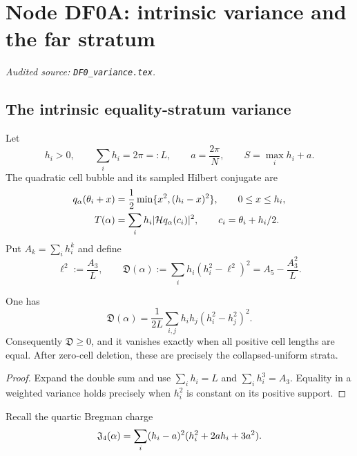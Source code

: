 \begingroup
\section{Node DF0A: intrinsic variance and the far stratum}
\label{module:DF0A}
\noindent\textit{Audited source: \nolinkurl{DF0_variance.tex}.}
\subsection{The intrinsic equality-stratum variance}

Let
\begin{equation}\label{DF0A:eq:data}
 h_i>0,\qquad \sum_i h_i=2\pi=:L,
 \qquad a=\frac{2\pi}{N},\qquad
 S=\max_i h_i+a.
\end{equation}
The quadratic cell bubble and its sampled Hilbert conjugate are
\begin{align}
 q_\alpha(\theta_i+x)
 &=\frac12\min\{x^2,(h_i-x)^2\},\qquad 0\le x\le h_i,
 \label{DF0A:eq:q}\\
 T(\alpha)&=\sum_i h_i|\mathcal H q_\alpha(c_i)|^2,
 \qquad c_i=\theta_i+h_i/2.\label{DF0A:eq:T}
\end{align}
Put $A_k=\sum_i h_i^k$ and define
\begin{equation}\label{DF0A:eq:D}
 \ell^2:=\frac{A_3}{L},
 \qquad
 \boxed{\mathfrak D(\alpha)
 :=\sum_i h_i(h_i^2-\ell^2)^2
 =A_5-\frac{A_3^2}{L}.}
\end{equation}

\begin{lemma}
\label{DF0A:lem:pair}
One has
\begin{equation}\label{DF0A:eq:pair}
 \mathfrak D(\alpha)
 =\frac1{2L}\sum_{i,j}h_ih_j(h_i^2-h_j^2)^2.
\end{equation}
Consequently $\mathfrak D\ge0$, and it vanishes exactly when all
positive cell lengths are equal.  After zero-cell deletion, these are
precisely the collapsed-uniform strata.
\end{lemma}

\begin{proof}
Expand the double sum and use $\sum_i h_i=L$ and
$\sum_i h_i^3=A_3$.  Equality in a weighted variance holds precisely
when $h_i^2$ is constant on its positive support.
\end{proof}

Recall the quartic Bregman charge
\begin{equation}\label{DF0A:eq:J}
 \mathfrak J_4(\alpha)=\sum_i(h_i-a)^2(h_i^2+2ah_i+3a^2).
\end{equation}

